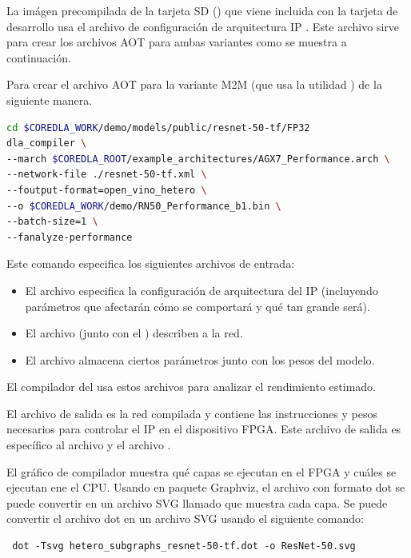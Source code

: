     La im\'agen precompilada de la tarjeta SD () que viene incluida con la tarjeta de desarrollo usa el archivo de configuraci\'on de arquitectura IP . Este archivo sirve para crear los archivos AOT para ambas variantes como se muestra a continuaci\'on. 
    
    Para crear el archivo AOT para la variante M2M (que usa la utilidad ) de la siguiente manera.

    \begin{lstlisting}[language=bash]
cd $COREDLA_WORK/demo/models/public/resnet-50-tf/FP32
dla_compiler \
--march $COREDLA_ROOT/example_architectures/AGX7_Performance.arch \
--network-file ./resnet-50-tf.xml \
--foutput-format=open_vino_hetero \
--o $COREDLA_WORK/demo/RN50_Performance_b1.bin \
--batch-size=1 \
--fanalyze-performance    \end{lstlisting}

    Este comando especifica los siguientes archivos de entrada:
    \begin{itemize}
        \item El archivo \curl{.arch} especifica la configuraci\'on de arquitectura del IP (incluyendo par\'ametros que afectar\'an c\'omo se comportar\'a y qu\'e tan grande ser\'a).
        \item El archivo  (junto con el ) describen a la red.
        \item El archivo \curl{.bin} almacena ciertos par\'ametros junto con los pesos del modelo.
    \end{itemize}

    El compilador del \ais usa estos archivos para analizar el rendimiento estimado.

    El archivo de salida \curl{RN50_Performance_b1.bin} es la red compilada y contiene las instrucciones y pesos necesarios para controlar el \ais IP en el dispositivo FPGA. Este archivo de salida es espec\'ifico al archivo  y el archivo .

    El gr\'afico de compilador muestra qu\'e capas se ejecutan en el FPGA y cu\'ales se ejecutan ene el CPU. Usando en paquete Graphviz, el archivo con formato dot se puede convertir en un archivo SVG llamado  que muestra cada capa. Se puede convertir el archivo dot en un archivo SVG usando el siguiente comando:
    \begin{lstlisting}
 dot -Tsvg hetero_subgraphs_resnet-50-tf.dot -o ResNet-50.svg \end{lstlisting}

